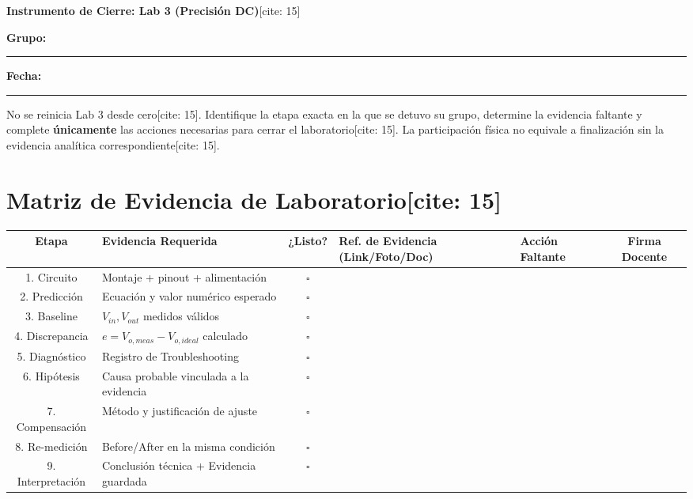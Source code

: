 \documentclass[11pt, a4paper]{article}
\begin{document}
\begin{center}
    \Large\textbf{\textcolor{ucbblue}{Instrumento de Cierre: Lab 3 (Precisión DC)}}[cite: 15]
\end{center}

\textbf{Grupo:} \rule{4cm}{0.4pt} \hfill \textbf{Fecha:} \rule{3cm}{0.4pt}

\begin{tcolorbox}[colback=red!5, colframe=red!70!black, title=\textbf{Instrucción Oficial[cite: 15]}]
    No se reinicia Lab 3 desde cero[cite: 15]. Identifique la etapa exacta en la que se detuvo su grupo, determine la evidencia faltante y complete \textbf{únicamente} las acciones necesarias para cerrar el laboratorio[cite: 15]. La participación física no equivale a finalización sin la evidencia analítica correspondiente[cite: 15].
\end{tcolorbox}

\section*{Matriz de Evidencia de Laboratorio[cite: 15]}
\begin{table}[h!]
    \centering
    \footnotesize
    \renewcommand{\arraystretch}{1.5}
    \begin{tabularx}{\textwidth}{|c|>{\raggedright\arraybackslash}p{3cm}|c|X|X|c|}
    \hline
    \textbf{Etapa} & \textbf{Evidencia Requerida} & \textbf{¿Listo?} & \textbf{Ref. de Evidencia (Link/Foto/Doc)} & \textbf{Acción Faltante} & \textbf{Firma Docente} \\ \hline
    1. Circuito & Montaje + pinout + alimentación & $\square$ & & & \\ \hline
    2. Predicción & Ecuación y valor numérico esperado & $\square$ & & & \\ \hline
    3. Baseline & $V_{in}, V_{out}$ medidos válidos & $\square$ & & & \\ \hline
    4. Discrepancia & $e = V_{o,meas} - V_{o,ideal}$ calculado & $\square$ & & & \\ \hline
    5. Diagnóstico & Registro de Troubleshooting & $\square$ & & & \\ \hline
    6. Hipótesis & Causa probable vinculada a la evidencia & $\square$ & & & \\ \hline
    7. Compensación & Método y justificación de ajuste & $\square$ & & & \\ \hline
    8. Re-medición & Before/After en la misma condición & $\square$ & & & \\ \hline
    9. Interpretación & Conclusión técnica + Evidencia guardada & $\square$ & & & \\ \hline
    \end{tabularx}
\end{table}
\end{document}
